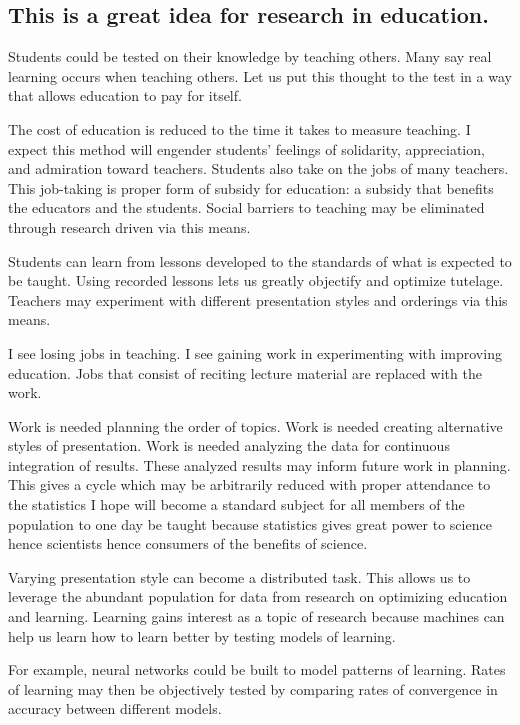 \begin{enumerate}
\begin{enumerate}
\subsection*{ This is a great idea for research in education. }
Students could be tested on their knowledge by teaching others. Many say real learning occurs when teaching others. Let us put this thought to the test in a way that allows education to pay for itself.

The cost of education is reduced to the time it takes to measure teaching. I expect this method will engender students' feelings of solidarity, appreciation, and admiration toward teachers. Students also take on the jobs of many teachers. This job-taking is proper form of subsidy for education: a subsidy that benefits the educators and the students. Social barriers to teaching may be eliminated through research driven via this means.

Students can learn from lessons developed to the standards of what is expected to be taught. Using recorded lessons lets us greatly objectify and optimize tutelage. Teachers may experiment with different presentation styles and orderings via this means.

I see losing jobs in teaching. I see gaining work in experimenting with improving education. Jobs that consist of reciting lecture material are replaced with the work.

Work is needed planning the order of topics. Work is needed creating alternative styles of presentation. Work is needed analyzing the data for continuous integration of results. These analyzed results may inform future work in planning. This gives a cycle which may be arbitrarily reduced with proper attendance to the statistics I hope will become a standard subject for all members of the population to one day be taught because statistics gives great power to science hence scientists hence consumers of the benefits of science.

Varying presentation style can become a distributed task. This allows us to leverage the abundant population for data from research on optimizing education and learning. Learning gains interest as a topic of research because machines can help us learn how to learn better by testing models of learning.

For example, neural networks could be built to model patterns of learning. Rates of learning may then be objectively tested by comparing rates of convergence in accuracy between different models.


\end{enumerate}
\end{enumerate}
